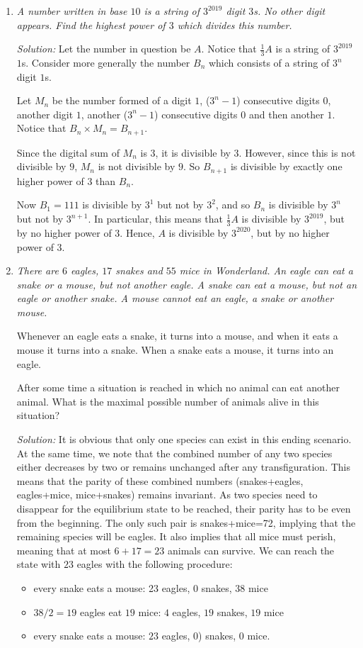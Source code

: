 \documentclass{article}
\begin{document}
\begin{enumerate}[1.]
\item %
{\itshape
A number written in base $10$ is a string of $3^{2019}$ digit $3$s.
No other digit appears.
Find the highest power of $3$ which divides this number.}

\textit{Solution:}
Let the number in question be $A$.
Notice that $\frac{1}{3}A$ is a string of $3^{2019}$ $1$s. Consider more generally the number $B_n$ which consists of a string of $3^n$ digit $1$s.

Let $M_n$ be the number formed of a digit $1$, ($3^n - 1$) consecutive digits $0$, another digit $1$, another ($3^n - 1$) consecutive digits $0$ and then another $1$.
Notice that $B_n \times M_n = B_{n + 1}$.

Since the digital sum of $M_n$ is $3$, it is divisible by $3$.
However, since this is not divisible by $9$, $M_n$ is not divisible by $9$. So $B_{n + 1}$ is divisible by exactly one higher power of $3$ than $B_n$.

Now $B_1 = 111$ is divisible by $3^1$ but not by $3^2$, and so $B_n$ is divisible by $3^n$ but not by $3^{n + 1}$.
In particular, this means that $\frac{1}{3}A$ is divisible by $3^{2019}$, but by no higher power of $3$.
Hence, $A$ is divisible by $3^{2020}$, but by no higher power of $3$.


\item %
{\itshape
There are $6$ eagles, $17$ snakes and $55$ mice in Wonderland.
An eagle can eat a snake or a mouse, but not another eagle.
A snake can eat a mouse, but not an eagle or another snake.
A mouse cannot eat an eagle, a snake or another mouse.

Whenever an eagle eats a snake, it turns into a mouse, and when it eats a mouse it turns into a snake. When a snake eats a mouse, it turns into an eagle.

After some time a situation is reached in which no animal can eat another animal.
What is the maximal possible number of animals alive in this situation?}

\textit{Solution:}
It is obvious that only one species can exist in this ending scenario. At the same time, we note that the combined number of any two species either decreases by two or remains unchanged after any transfiguration. This means that the parity of these combined numbers (snakes+eagles, eagles+mice, mice+snakes) remains invariant.
As two species need to disappear for the equilibrium state to be reached, their parity has to be even from the beginning. The only such pair is snakes+mice=72, implying that the remaining species will be eagles.
It also implies that all mice must perish, meaning that at most $6+17=23$ animals can survive. We can reach the state with $23$ eagles with the following procedure:
\begin{itemize}
  \item every snake eats a mouse: 23 eagles, 0 snakes, 38 mice
  \item $38/2=19$ eagles eat $19$ mice: $4$ eagles, $19$ snakes, $19$ mice
  \item every snake eats a mouse: $23$ eagles, $0$) snakes, $0$ mice.
\end{itemize}



\end{enumerate}
\end{document}
